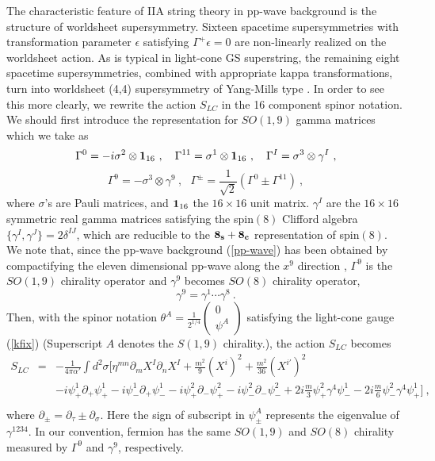 \documentclass[a4paper,12pt]{article}
\numberwithin{equation}{section}
\begin{document}
The characteristic feature of IIA string theory in pp-wave background
is the structure of worldsheet supersymmetry.  Sixteen spacetime
supersymmetries with transformation parameter $\epsilon$ satisfying
$\Gamma^+ \epsilon = 0$ are non-linearly realized on the worldsheet
action.  As is typical in light-cone GS superstring, the remaining
eight spacetime supersymmetries, combined with appropriate kappa
transformations, turn into worldsheet (4,4) supersymmetry of
Yang-Mills type \cite{hyu074}.  In order to see this more clearly, we
rewrite the action $S_{LC}$ in the 16 component spinor notation.  We
should first introduce the representation for $SO(1,9)$ gamma matrices
which we take as
\[
 \Gamma^0= -i\sigma^2 \otimes {\bf 1}_{16}~,~~~
 \Gamma^{11}= \sigma^1 \otimes {\bf 1}_{16}~,~~~
 \Gamma^I= \sigma^3 \otimes \gamma^I~,
\]
\begin{equation}
 \Gamma^9= -\sigma^3 \otimes \gamma^9~,~~~
 \Gamma^{\pm} = \frac{1}{\sqrt{2}}(\Gamma^0 \pm \Gamma^{11})~,
\label{gamma}
\end{equation}
where $\sigma$'s are Pauli matrices, and ${\bf 1}_{16}$ the $16 \times
16$ unit matrix. $\gamma^I$ are the $16 \times 16$ symmetric real
gamma matrices satisfying the spin$(8)$ Clifford algebra $\{ \gamma^I,
\gamma^J \} = 2 \delta^{IJ}$, which are reducible to the ${\bf
  8_s}+{\bf 8_c}$ representation of spin$(8)$.  We note that, since
the pp-wave background (\ref{pp-wave}) has been obtained by
compactifying the eleven dimensional pp-wave along the $x^9$ direction
\cite{hyu074}, $\Gamma^9$ is the $SO(1,9)$ chirality operator and
$\gamma^9$ becomes $SO(8)$ chirality operator,
\begin{equation}
\gamma^9 = \gamma^1 \cdots \gamma^8~.
\end{equation}
Then, with the spinor notation $\theta^A = \frac{1}{2^{1/4}} \left(
\begin{array}{c} 0 \\ \psi^A
\end{array} \right)$ satisfying the light-cone gauge (\ref{kfix})
(Superscript $A$ denotes the $S(1,9)$ chirality.), the action $S_{LC}$
becomes
\begin{eqnarray}
S_{LC}
 &=&  - \frac{1}{4 \pi \alpha'} \int  d^2 \sigma
 \Bigg[ \eta^{mn} \partial_m X^I \partial_n X^I
      + \frac{m^2}{9} (X^i)^2
      + \frac{m^2}{36} (X^{i'})^2
                       \nonumber \\
 & & - i \psi_+^1 \partial_+  \psi^1_+
     - i \psi_-^1 \partial_+  \psi^1_-
     - i \psi^2_+ \partial_- \psi^2_+
     - i \psi^2_- \partial_- \psi^2_-
     +2i \frac{m}{3} \psi^2_+ \gamma^4 \psi^1_-
     - 2i \frac{m}{6} \psi^2_- \gamma^4 \psi^1_+
 \Bigg]~,
                       \nonumber \\
\label{lc-action}
\end{eqnarray}
where $\partial_\pm =\partial_\tau\pm \partial_\sigma$.  Here the sign
of subscript in $\psi^A_\pm$ represents the eigenvalue of
$\gamma^{1234}$.  In our convention, fermion has the same $SO(1,9)$
and $SO(8)$ chirality measured by $\Gamma^9$ and $\gamma^9$,
respectively.
\end{document}

